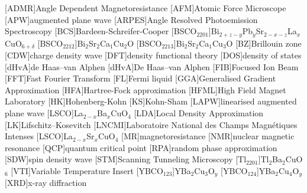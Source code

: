 
\cleardoublepage



[ADMR]{Angle Dependent Magnetoresistance}
[AFM]{Atomic Force Microscope}
[APW]{augmented plane wave}
[ARPES]{Angle Resolved Photoemission Spectroscopy}
[BCS]{Bardeen-Schreifer-Cooper}
[BSCO$_{2201}$]{Bi$_{2+z-y}$Pb$_{y}$Sr$_{2-x-z}$La$_{x}$CuO$_{6+\delta}$}
[BSCO$_{2212}$]{Bi$_2$Sr$_2$Ca$_1$Cu$_2$O}
[BSCO$_{2213}$]{Bi$_2$Sr$_2$Ca$_1$Cu$_3$O}
[BZ]{Brillouin zone}
[CDW]{charge density wave}
[DFT]{density functional theory}
[DOS]{density of states}
[dHvA]{de Haas--van Alphen}
[dHvA]{De Haas--van Alphen}
[FIB]{Focused Ion Beam}
[FFT]{Fast Fourier Transform}
[FL]{Fermi liquid}
[GGA]{Generalised Gradient Approximation}
[HFA]{Hartree-Fock approximation}
[HFML]{High Field Magnet Laboratory}
[HK]{Hohenberg-Kohn}
[KS]{Kohn-Sham}
[LAPW]{linearised augmented plane wave}
[LSCO]{La$_{2-x}$Ba$_x$CuO$_4$}
[LDA]{Local Density Approximation}
[LK]{Lifschitz--Kosevitch}
[LNCMI]{Laboratoire National des Champs Magn\'{e}tiques Intenses} 
[LSCO]{La$_{2-x}$Sr$_x$CuO$_4$}
[MR]{magnetoresistance}
[NMR]{nuclear magnetic resonance}
[QCP]{quantum critical point}
[RPA]{random phase approximation}
[SDW]{spin density wave}
[STM]{Scanning Tunneling Microscopy}
[Tl$_{2201}$]{Tl$_2$Ba$_2$CuO$_6$}
[VTI]{Variable Temperature Insert}
[YBCO$_{123}$]{YBa$_2$Cu$_3$O$_y$}
[YBCO$_{124}$]{YBa$_2$Cu$_4$O$_y$}
[XRD]{x-ray diffraction}

